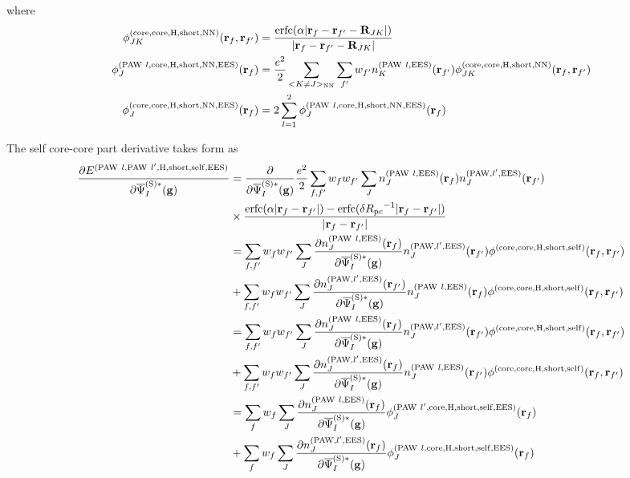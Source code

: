 \documentclass[paper=a4, fontsize=11pt]{article} %
\numberwithin{equation}{section} %
\numberwithin{figure}{section} %
\numberwithin{table}{section} %
\newcommand{\p}{\partial}
\newcommand{\bg}{{\bf{g}}}
\newcommand{\br}{{\bf{r}}}
\newcommand{\bR}{{\bf{R}}}
\newcommand{\rS}{{\mathrm{S}}}
\newcommand{\rEES}{{\mathrm{EES}}}
\newcommand{\rcore}{{\mathrm{core}}}
\newcommand{\rNN}{{\mathrm{NN}}}
\newcommand{\rself}{{\mathrm{self}}}
\newcommand{\rshort}{{\mathrm{short}}}
\newcommand{\rerfc}{{\mathrm{erfc}}}
\newcommand{\rP}{{\mathrm{PAW}}}
\newcommand{\rH}{{\mathrm{H}}}
\newcommand{\psigsc}{{\overline \Psi_I^{(\rS)*}(\bg)}}
\newcommand{\Rpc}{{R_{\mathrm{pc}}}}
\begin{document}
where
\begin{equation}
\begin{split}
\phi_{JK}^{(\rcore,\rcore,\rH,\rshort,\rNN)}(\br_f,\br_{f'}) &= \frac{\rerfc(\alpha|\br_f-\br_{f'}-\bR_{JK}|)}{|\br_f-\br_{f'}-\bR_{JK}|} \\
\phi_J^{(\rP\ l,\rcore,\rH,\rshort,\rNN,\rEES)}(\br_f) &= \frac{e^2}{2}\sum_{<K \neq J>_\rNN}\sum_{f'}w_{f'}n_K^{(\rP\ l,\rEES)}(\br_{f'}) \phi_{JK}^{(\rcore,\rcore,\rH,\rshort,\rNN)}(\br_f,\br_{f'}) \\
\phi_J^{(\rcore,\rcore,\rH,\rshort,\rNN,\rEES)}(\br_f) &= 2\sum_{l=1}^2 \phi_J^{(\rP\ l,\rcore,\rH,\rshort,\rNN,\rEES)}(\br_f) \\
\end{split}
\end{equation}

The self core-core part derivative takes form as
\begin{equation}
\begin{split}
\frac{\p E^{(\rP\ l,\rP\ l',\rH,\rshort,\rself,\rEES)}}{\p \psigsc}
&= \frac{\p }{\p \psigsc} \frac{e^2}{2}\sum_{f,f'} w_f w_{f'} \sum_J n_J^{(\rP\ l,\rEES)}(\br_f) n_J^{(\rP,l',\rEES)}(\br_{f'})\\
&\times \frac{\rerfc(\alpha|\br_f-\br_{f'}|)-\rerfc(\delta \Rpc^{-1}|\br_f-\br_{f'}|)}{|\br_f-\br_{f'}|}\\
&= \sum_{f,f'} w_f w_{f'} \sum_J \frac{\p n_J^{(\rP\ l,\rEES)}(\br_f) }{\p \psigsc}n_J^{(\rP,l',\rEES)}(\br_{f'})\phi^{(\rcore,\rcore,\rH,\rshort,\rself)}(\br_f,\br_{f'}) \\
&+ \sum_{f,f'} w_f w_{f'} \sum_J \frac{\p n_J^{(\rP,l',\rEES)}(\br_{f'}) }{\p \psigsc}n_J^{(\rP\ l,\rEES)}(\br_{f})\phi^{(\rcore,\rcore,\rH,\rshort,\rself)}(\br_f,\br_{f'}) \\
&= \sum_{f,f'} w_f w_{f'} \sum_J \frac{\p n_J^{(\rP\ l,\rEES)}(\br_f) }{\p \psigsc}n_J^{(\rP,l',\rEES)}(\br_{f'})\phi^{(\rcore,\rcore,\rH,\rshort,\rself)}(\br_f,\br_{f'}) \\
&+ \sum_{f,f'} w_f w_{f'} \sum_J \frac{\p n_J^{(\rP,l',\rEES)}(\br_f) }{\p \psigsc}n_J^{(\rP\ l,\rEES)}(\br_{f'})\phi^{(\rcore,\rcore,\rH,\rshort,\rself)}(\br_f,\br_{f'}) \\
&= \sum_{f} w_f \sum_J \frac{\p n_J^{(\rP\ l,\rEES)}(\br_f) }{\p \psigsc}\phi_J^{(\rP\ l',\rcore,\rH,\rshort,\rself,\rEES)}(\br_f) \\
&+ \sum_{f} w_f \sum_J \frac{\p n_J^{(\rP,l',\rEES)}(\br_f) }{\p \psigsc}\phi_J^{(\rP\ l,\rcore,\rH,\rshort,\rself,\rEES)}(\br_f) \\
\end{split}
\end{equation}
\end{document}
